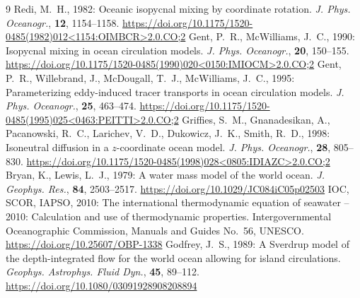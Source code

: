 \documentclass{article}
\begin{document}
\begin{thebibliography}{9}
 Redi, M.~H., 1982: Oceanic isopycnal mixing by coordinate rotation. \textit{J. Phys. Oceanogr.}, \textbf{12}, 1154--1158. \url{https://doi.org/10.1175/1520-0485(1982)012<1154:OIMBCR>2.0.CO;2}
 Gent, P.~R., McWilliams, J.~C., 1990: Isopycnal mixing in ocean circulation models. \textit{J. Phys. Oceanogr.}, \textbf{20}, 150--155. \url{https://doi.org/10.1175/1520-0485(1990)020<0150:IMIOCM>2.0.CO;2}
 Gent, P.~R., Willebrand, J., McDougall, T.~J., McWilliams, J.~C., 1995: Parameterizing eddy-induced tracer transports in ocean circulation models. \textit{J. Phys. Oceanogr.}, \textbf{25}, 463--474. \url{https://doi.org/10.1175/1520-0485(1995)025<0463:PEITTI>2.0.CO;2}
 Griffies, S.~M., Gnanadesikan, A., Pacanowski, R.~C., Larichev, V.~D., Dukowicz, J.~K., Smith, R.~D., 1998: Isoneutral diffusion in a $z$-coordinate ocean model. \textit{J. Phys. Oceanogr.}, \textbf{28}, 805--830. \url{https://doi.org/10.1175/1520-0485(1998)028<0805:IDIAZC>2.0.CO;2}
 Bryan, K., Lewis, L.~J., 1979: A water mass model of the world ocean. \textit{J. Geophys. Res.}, \textbf{84}, 2503--2517. \url{https://doi.org/10.1029/JC084iC05p02503}
 IOC, SCOR, IAPSO, 2010: The international thermodynamic equation of seawater -- 2010: Calculation and use of thermodynamic properties. Intergovernmental Oceanographic Commission, Manuals and Guides No.~56, UNESCO. \url{https://doi.org/10.25607/OBP-1338}
 Godfrey, J.~S., 1989: A Sverdrup model of the depth-integrated flow for the world ocean allowing for island circulations. \textit{Geophys. Astrophys. Fluid Dyn.}, \textbf{45}, 89--112. \url{https://doi.org/10.1080/03091928908208894}
\end{thebibliography}
\end{document}
